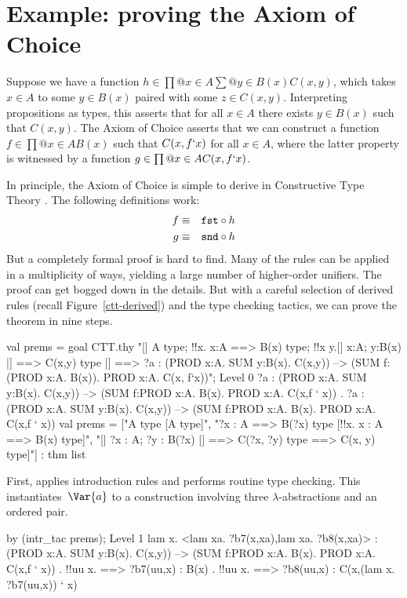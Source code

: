\section{Example: proving the Axiom of Choice} \label{ctt-choice}
Suppose we have a function $h\in \prod@{x\in A}\sum@{y\in B(x)} C(x,y)$,
which takes $x\in A$ to some $y\in B(x)$ paired with some $z\in C(x,y)$.
Interpreting propositions as types, this asserts that for all $x\in A$
there exists $y\in B(x)$ such that $C(x,y)$.  The Axiom of Choice asserts
that we can construct a function $f\in \prod@{x\in A}B(x)$ such that
$C(x,f{\tt`}x)$ for all $x\in A$, where the latter property is witnessed by a
function $g\in \prod@{x\in A}C(x,f{\tt`}x)$.

In principle, the Axiom of Choice is simple to derive in Constructive Type
Theory \cite[page~50]{martinlof84}.  The following definitions work:
\begin{eqnarray*}
    f & \equiv & {\tt fst} \circ h \\
    g & \equiv & {\tt snd} \circ h
\end{eqnarray*}
But a completely formal proof is hard to find.  Many of the rules can be
applied in a multiplicity of ways, yielding a large number of higher-order
unifiers.  The proof can get bogged down in the details.  But with a
careful selection of derived rules (recall Figure~\ref{ctt-derived}) and
the type checking tactics, we can prove the theorem in nine steps.
\begin{ttbox}
val prems = goal CTT.thy
    "[| A type;  !!x. x:A ==> B(x) type;              \ttback
\ttback       !!x y.[| x:A;  y:B(x) |] ==> C(x,y) type      \ttback
\ttback    |] ==> ?a :    (PROD x:A. SUM y:B(x). C(x,y))    \ttback
\ttback               --> (SUM f: (PROD x:A. B(x)). PROD x:A. C(x, f`x))";
{\out Level 0}
{\out ?a : (PROD x:A. SUM y:B(x). C(x,y)) -->}
{\out      (SUM f:PROD x:A. B(x). PROD x:A. C(x,f ` x))}
{. ?a : (PROD x:A. SUM y:B(x). C(x,y)) -->}
{\out          (SUM f:PROD x:A. B(x). PROD x:A. C(x,f ` x))}
\ttbreak
{\out val prems = ["A type  [A type]",}
{\out              "?x : A ==> B(?x) type  [!!x. x : A ==> B(x) type]",}
{\out              "[| ?x : A; ?y : B(?x) |] ==> C(?x, ?y) type}
{\out               [!!x y. [| x : A; y : B(x) |] ==> C(x, y) type]"]}
{\out             : thm list}
\end{ttbox}
First,  applies introduction rules and performs routine
type checking.  This instantiates~$\Var{a}$ to a construction involving
three $\lambda$-abstractions and an ordered pair.
\begin{ttbox}
by (intr_tac prems);
{\out Level 1}
{\out lam x. <lam xa. ?b7(x,xa),lam xa. ?b8(x,xa)>}
{\out : (PROD x:A. SUM y:B(x). C(x,y)) -->}
{\out   (SUM f:PROD x:A. B(x). PROD x:A. C(x,f ` x))}
{. !!uu x.}
{ ==>}
{\out        ?b7(uu,x) : B(x)}
{. !!uu x.}
{ ==>}
{\out        ?b8(uu,x) : C(x,(lam x. ?b7(uu,x)) ` x)}
\end{ttbox}
